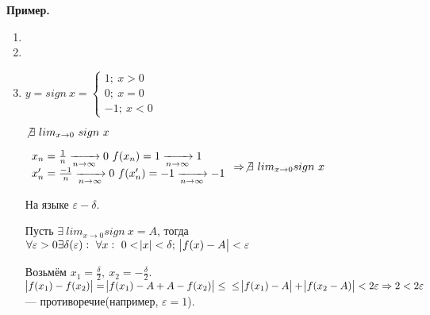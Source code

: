 \documentclass{article}
\begin{document}
  \textbf{Пример.}
  \begin{enumerate}
    \item %
    \item %
    \item \(y=sign\ x=\begin{cases}1;\ x>0\\ 0;\ x=0\\ -1;\ x<0\end{cases}\)

    \(\not \exists\ lim_{x \rightarrow 0}\ sign\ x\)

    \(
    \begin{array}{l}
      x_n = \frac{1}{n} \xrightarrow[n \rightarrow \infty]{} 0\ f(x_n)=1 \xrightarrow[n \rightarrow \infty]{} 1\\
      x_n' = \frac{-1}{n} \xrightarrow[n \rightarrow \infty]{} 0\ f(x_n')=-1 \xrightarrow[n \rightarrow \infty]{} -1
    \end{array} \Rightarrow
    \not\exists\ lim_{x \rightarrow 0} sign\ x
    \)

    На языке \(\varepsilon - \delta.\)

    Пусть \(\exists\ lim_{x \rightarrow 0} sign\ x = A\), тогда \(\forall \varepsilon > 0 \exists \delta(\varepsilon):\ \forall x:\ 0 < \abs{x} < \delta;\ \abs{f(x)-A}<\varepsilon\)

    Возьмём \(x_1 = \frac{\delta}{2},\ x_2 = -\frac{\delta}{2}\). \(\abs{f(x_1)-f(x_2)} = \abs{f(x_1)-A+A-f(x_2)} \leq\\ \leq \abs{f(x_1)-A}+\abs{f(x_2-A)} < 2 \varepsilon \Rightarrow 2 < 2\varepsilon\) --- противоречие(например, \(\varepsilon = 1\)).
  \end{enumerate}
\end{document}

